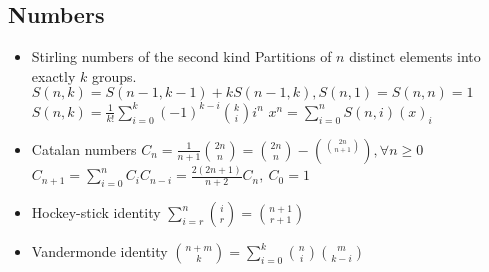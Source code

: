 \documentclass[10pt, a4paper, twocolumn, oneside]{article}
\begin{document}
\subsection{Numbers}
\begin{itemize}
\item Stirling numbers of the second kind
Partitions of $n$ distinct elements into exactly $k$ groups. 
$S(n, k) = S(n - 1, k - 1) + kS(n - 1, k), S(n, 1) = S(n, n) = 1$
$S(n, k) = \frac{1}{k!}\sum_{i=0}^{k}(-1)^{k-i}{k \choose i}i^n$
$x^n     = \sum_{i=0}^{n} S(n, i) (x)_i$
\item Catalan numbers
$C_n = \frac{1}{n+1}{2n \choose n} = {2n \choose n}-\binom{2n \choose n+1}\ , \forall n \geq 0 $
$C_{n+1} = \sum_{i=0}^{n} C_iC_{n-i} = \frac{2(2n+1)}{n+2}C_n,\ C_0 = 1$
\item Hockey-stick identity
$\sum_{i = r}^{n} {i \choose r} = {n + 1 \choose r + 1}$
\item Vandermonde identity
${n + m \choose k} = \sum_{i = 0}^{k} {n \choose i} {m \choose k - i}$
\end{itemize}
\end{document}
